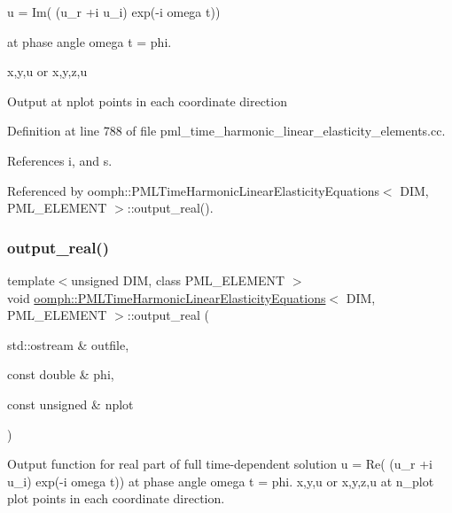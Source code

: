 u = Im( (u\+\_\+r +i u\+\_\+i) exp(-\/i omega t))

at phase angle omega t = phi.

x,y,u or x,y,z,u

Output at nplot points in each coordinate direction 

Definition at line 788 of file pml\+\_\+time\+\_\+harmonic\+\_\+linear\+\_\+elasticity\+\_\+elements.\+cc.



References i, and s.



Referenced by oomph\+::\+P\+M\+L\+Time\+Harmonic\+Linear\+Elasticity\+Equations$<$ D\+I\+M, P\+M\+L\+\_\+\+E\+L\+E\+M\+E\+N\+T $>$\+::output\+\_\+real().

\mbox{\label{classoomph_1_1PMLTimeHarmonicLinearElasticityEquations_aee6212321a7224dccef2a98963fd7987}} 
\subsubsection{\texorpdfstring{output\+\_\+real()}{output\_real()}}
{\footnotesize\ttfamily template$<$unsigned D\+IM, class P\+M\+L\+\_\+\+E\+L\+E\+M\+E\+NT $>$ \\
void \hyperlink{classoomph_1_1PMLTimeHarmonicLinearElasticityEquations}{oomph\+::\+P\+M\+L\+Time\+Harmonic\+Linear\+Elasticity\+Equations}$<$ D\+IM, P\+M\+L\+\_\+\+E\+L\+E\+M\+E\+NT $>$\+::output\+\_\+real (\begin{DoxyParamCaption}\item[{std\+::ostream \&}]{outfile,  }\item[{const double \&}]{phi,  }\item[{const unsigned \&}]{nplot }\end{DoxyParamCaption})}



Output function for real part of full time-\/dependent solution u = Re( (u\+\_\+r +i u\+\_\+i) exp(-\/i omega t)) at phase angle omega t = phi. x,y,u or x,y,z,u at n\+\_\+plot plot points in each coordinate direction. 

